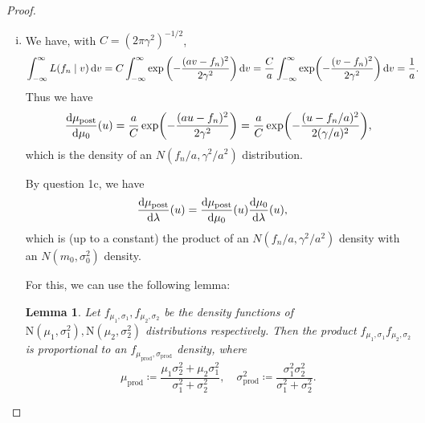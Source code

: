 \documentclass{article}
\theoremstyle{plain}
\newtheorem{lemma}{Lemma}
\theoremstyle{remark}
\newcommand{\Rm}{\mathrm}
\newcommand\ceq\coloneqq %
\newcommand\pro{_\Rm{prod}}
\begin{document}
\begin{proof}
	\begin{enumerate}[(i)]
		\item 
		We have, with $C = (2\pi\gamma^2)^{-1/2}$, 
		\begin{align*}
			\int_{-\infty}^\infty L(f_n \mid v) \dd{v} &=  C \int_{-\infty}^\infty \exp\qty(- \frac{(av - f_n)^2}{2\gamma^2}) \dd{v} = \frac Ca \int_{-\infty}^\infty \exp(- \frac{(v - f_n)^2}{2\gamma^2}) \dd{v} = \frac1a. 
		\end{align*} 
		Thus we have
		\[
		\dv{\mu_\Rm{post}}{\mu_0} \qty(u)= \frac aC \exp(- \frac{(au - f_n)^2}{2\gamma^2}) = \frac aC \exp(- \frac{(u - f_n/a)^2}{2(\gamma / a)^2}),
		\]
		which is the density of an $N(f_n/a, \gamma^2/a^2)$ distribution. 
		
		By question 1c, we have
		\begin{align*}
			\dv{\mu_\Rm{post}}{\lambda} \qty(u)&= \dv{\mu_\Rm{post}}{\mu_0} \qty(u)\dv{\mu_0}{\lambda}\qty(u),
		\end{align*}
		which is (up to a constant) the product of an $N(f_n/a, \gamma^2/a^2)$ density with an $N(m_0, \sigma_0^2)$ density. 
		
		For this, we can use the following lemma:
		\begin{mdframed}
		\begin{lemma}
			Let $f_{\mu_1, \sigma_1}, f_{\mu_2, \sigma_2}$ be the density functions of $\Rm N(\mu_1, \sigma_1^2), \Rm N(\mu_2, \sigma_2^2)$ distributions respectively. Then the product $f_{\mu_1, \sigma_1} f_{\mu_2, \sigma_2}$ is proportional to an $f_{\mu\pro, \sigma\pro}$ density, where
			\[
			\mu\pro \ceq \frac{\mu_1\sigma_2^2 + \mu_2\sigma_1^2}{\sigma_1^2 + \sigma_2^2}, \quad \sigma\pro^2 \ceq \frac{\sigma_1^2\sigma_2^2}{\sigma_1^2 + \sigma_2^2}. 
			\]
		\end{lemma}
	

\end{mdframed}
\end{enumerate}
\end{proof}
\end{document}
